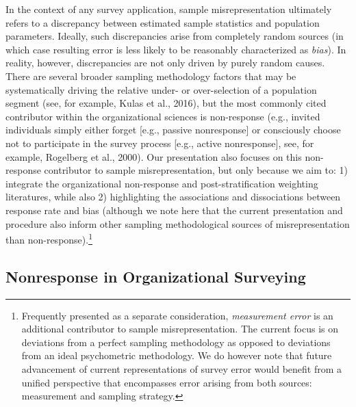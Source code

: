 \documentclass[
  man,floatsintext]{apa7}
\begin{document}
In the context of any survey application, sample misrepresentation ultimately refers to a discrepancy between estimated sample statistics and population parameters. Ideally, such discrepancies arise from completely random sources (in which case resulting error is less likely to be reasonably characterized as \emph{bias}). In reality, however, discrepancies are not only driven by purely random causes. There are several broader sampling methodology factors that may be systematically driving the relative under- or over-selection of a population segment (see, for example, Kulas et al., 2016), but the most commonly cited contributor within the organizational sciences is non-response (e.g., invited individuals simply either forget {[}e.g., passive nonresponse{]} or consciously choose not to participate in the survey process {[}e.g., active nonresponse{]}, see, for example, Rogelberg et al., 2000). Our presentation also focuses on this non-response contributor to sample misrepresentation, but only because we aim to: 1) integrate the organizational non-response and post-stratification weighting literatures, while also 2) highlighting the associations and dissociations between response rate and bias (although we note here that the current presentation and procedure also inform other sampling methodological sources of misrepresentation than non-response).\footnote{Frequently presented as a separate consideration, \emph{measurement error} is an additional contributor to sample misrepresentation. The current focus is on deviations from a perfect sampling methodology as opposed to deviations from an ideal psychometric methodology. We do however note that future advancement of current representations of survey error would benefit from a unified perspective that encompasses error arising from both sources: measurement and sampling strategy.}

\hypertarget{nonresponse-in-organizational-surveying}{%
\subsection{Nonresponse in Organizational Surveying}\label{nonresponse-in-organizational-surveying}}
\end{document}
